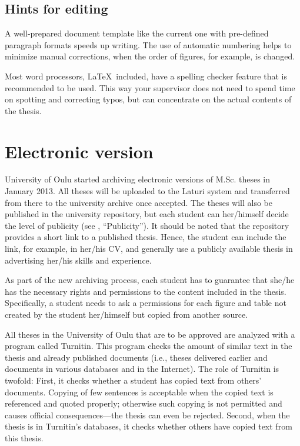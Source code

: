 \subsection{Hints for editing}

A well-prepared document template like the current one with
pre-defined paragraph formats speeds up writing. The use of automatic
numbering helps to minimize manual corrections, when the order of
figures, for example, is changed.

Most word processors, \LaTeX\ included, have a spelling checker
feature that is recommended to be used. This way your supervisor does
not need to spend time on spotting and correcting typos, but can
concentrate on the actual contents of the thesis.

\section{Electronic version}

University of Oulu started archiving electronic versions of M.Sc.
theses in January 2013. All theses will be uploaded to the Laturi
system and transferred from there to the university archive once
accepted. The theses will also be published in the university
repository, but each student can her/himself decide the level of
publicity (see , “Publicity”). It should be
noted that the repository provides a short link to a published
thesis. Hence, the student can include the link, for example, in
her/his CV, and generally use a publicly available thesis in
advertising her/his skills and experience.

As part of the new archiving process, each student has to guarantee
that she/he has the necessary rights and permissions to the content
included in the thesis. Specifically, a student needs to ask a
permissions for each figure and table not created by the student
her/himself but copied from another source.

All theses in the University of Oulu that are to be approved are
analyzed with a program called Turnitin. This program checks the
amount of similar text in the thesis and already published documents
(i.e., theses delivered earlier and documents in various databases and
in the Internet). The role of Turnitin is twofold: First, it checks
whether a student has copied text from others’ documents. Copying of
few sentences is acceptable when the copied text is referenced and
quoted properly; otherwise such copying is not permitted and causes
official consequences---the thesis can even be rejected. Second, when
the thesis is in Turnitin’s databases, it checks whether others have
copied text from this thesis.

